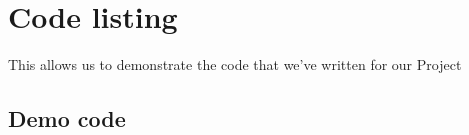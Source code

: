 \section{Code listing}
\label{sec:code_listing}

This allows us to demonstrate the code that we've written for our Project

\subsection{Demo code}



\raggedbottom